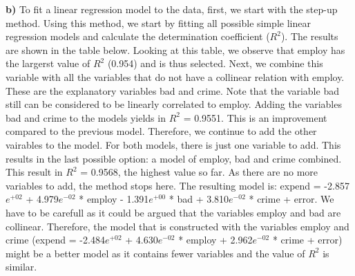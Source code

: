 \documentclass[]{article}
\begin{document}
\textbf{b)} To fit a linear regression model to the data, first, we
start with the step-up method. Using this method, we start by fitting
all possible simple linear regression models and calculate the
determination coefficient (\(R^{2}\)). The results are shown in the
table below. Looking at this table, we observe that employ has the
largerst value of \(R^{2}\) (0.954) and is thus selected. Next, we
combine this variable with all the variables that do not have a
collinear relation with employ. These are the explanatory variables bad
and crime. Note that the variable bad still can be considered to be
linearly correlated to employ. Adding the variables bad and crime to the
models yields in \(R^{2}\) = 0.9551. This is an improvement compared to
the previous model. Therefore, we continue to add the other vairables to
the model. For both models, there is just one variable to add. This
results in the last possible option: a model of employ, bad and crime
combined. This result in \(R^{2}\) = 0.9568, the highest value so far.
As there are no more variables to add, the method stops here. The
resulting model is: expend = -2.857\(e^{+02}\) + 4.979\(e^{-02}\) *
employ - 1.391\(e^{+00}\) * bad + 3.810\(e^{-02}\) * crime + error. We
have to be carefull as it could be argued that the variables employ and
bad are collinear. Therefore, the model that is constructed with the
variables employ and crime (expend = -2.484\(e^{+02}\) +
4.630\(e^{-02}\) * employ + 2.962\(e^{-02}\) * crime + error) might be a
better model as it contains fewer variables and the value of \(R^{2}\)
is similar.
\end{document}
